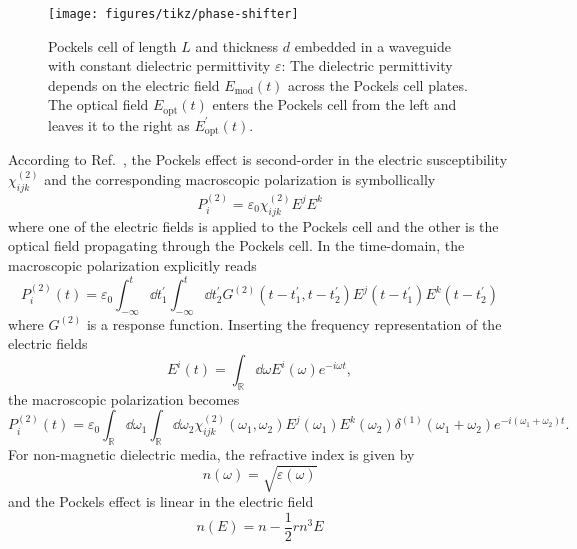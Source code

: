 \begin{figure}[htb]
    \centering
    \texttt{[image: figures/tikz/phase-shifter]}
    \caption{Pockels cell of length $L$ and thickness $d$ embedded in a waveguide with constant dielectric permittivity $\varepsilon$: The dielectric permittivity depends on the electric field $E_\text{mod}(t)$ across the Pockels cell plates. The optical field $E_\text{opt}(t)$ enters the Pockels cell from the left and leaves it to the right as $E^\prime_\text{opt}(t)$.}
\end{figure}

According to Ref.~\cite[p.~14]{Murti2014}, the Pockels effect is second-order in the electric susceptibility $\chi_{ijk}^{(2)}$ and the corresponding macroscopic polarization is symbollically
\begin{equation}
	P_i^{(2)}
	=
	\varepsilon_0
	\chi_{ijk}^{(2)}
	E^jE^k
\end{equation}
where one of the electric fields is applied to the Pockels cell and the other is the optical field propagating through the Pockels cell.
In the time-domain, the macroscopic polarization explicitly reads~\cite[p.~17]{Murti2014}
\begin{equation}
	P_i^{(2)}(t)
	=
	\varepsilon_0
	\int_{-\infty}^t\dd{t_1^\prime}
	\int_{-\infty}^t\dd{t_2^\prime}
	G^{(2)}(t-t_1^\prime,t-t_2^\prime)
	E^j(t-t_1^\prime)
	E^k(t-t_2^\prime)
\end{equation}
where $G^{(2)}$ is a response function.
Inserting the frequency representation of the electric fields
\begin{equation}
	E^i(t)
	=
	\int_\mathbb{R}\dd{\omega}
	E^i(\omega)e^{-i\omega t}
	,
\end{equation}
the macroscopic polarization becomes~\cite[p.~20]{Murti2014}
\begin{equation}
	P_i^{(2)}(t)
	=
	\varepsilon_0
	\int_\mathbb{R}\dd{\omega_1}
	\int_\mathbb{R}\dd{\omega_2}
	\chi_{ijk}^{(2)}(\omega_1,\omega_2)
	E^j(\omega_1)
	E^k(\omega_2)
	\delta^{(1)}(\omega_1+\omega_2)
	e^{-i(\omega_1+\omega_2)t}
	.
\end{equation}
For non-magnetic dielectric media, the refractive index is given by
\begin{equation}
	n(\omega)
	=
	\sqrt{\varepsilon(\omega)}
\end{equation}
and the Pockels effect is linear in the electric field~\cite[p.~698]{Saleh2007}
\begin{equation}
	n(E)
	=
	n
	-
	\frac{1}{2}
	rn^3E
\end{equation}

